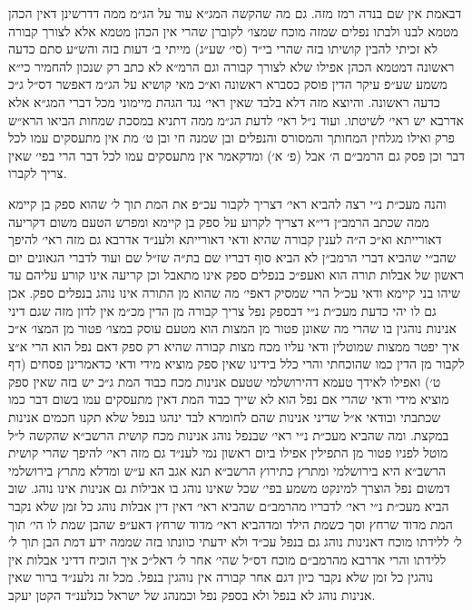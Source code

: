 \documentclass[12pt, openany]{book}
\begin{document}
\begin{multicols}{2}
דבאמת אין שם בנדה רמז מזה. גם מה שהקשה המג״א עוד על הג״מ ממה דדרשינן דאין הכהן מטמא לבנו ולבתו נפלים שמזה מוכח שמצו׳ לקוברן שהרי אין הכהן מטמא אלא לצורך קבורה לא זכיתי להבין קושיתו בזה שהרי בי״ד (סי׳ שע״ג) מייתי ב׳ דעות בזה והש״ע סתם כדעה ראשונה דמטמא הכהן אפילו שלא לצורך קבורה וגם הרמ״א לא כתב רק שנכון להחמיר כי״א משמע שע״פ עיקר הדין פוסק כסברא ראשונה וא״כ מאי קושיא על הג״מ דאפשר דס״ל ג״כ כדעה ראשונה. והיוצא מזה דלא בלבד שאין ראי׳ נגד הגהת מיימוני מכל דברי המג״א אלא אדרבא יש ראי׳ לשיטתו. ועוד נ״ל ראי׳ לדעת הג״מ ממה דתניא במסכת שמחות הביאו הרא״ש פרק ואילו מגלחין המחותך והמסורס והנפלים ובן שמנה חי ובן ט׳ מת אין מתעסקים עמו לכל דבר וכן פסק גם הרמב״ם ה׳ אבל (פ׳ א׳) ומדקאמר אין מתעסקים עמו לכל דבר הרי בפי׳ שאין צריך לקברו.\\\vspace{0pt}

והנה מעכ״ת נ״י רצה להביא ראי׳ דצריך לקבור עכ״פ את המת תוך ל׳ שהוא ספק בן קיימא ממה שכתב הרמב״ן די״א דצריך לקרוע על ספק בן קיימא ומפרש הטעם משום דקריעה דאורייתא וא״כ ה״ה לענין קבורה שהיא ודאי דאורייתא ולענ״ד אדרבא גם מזה ראי׳ להיפך שהב״י שהביא דברי הרמב״ן לא הביא סוף דבריו שם בת״ה שז״ל שם ועוד לדברי הגאונים יום ראשון של אבלות תורה הוא ואעפ״כ בנפלים ספק אינו מתאבל וכן קריעה אינו קורע עליהם עד שיהו בני קיימא ודאי עכ״ל הרי שמסיק דאפי׳ מה שהוא מן התורה אינו נוהג בנפלים ספק. אכן גם לו יהי כדעת מעכ״ת נ״י דבספק נפל צריך קבורה מן הדין מכ״מ אין לדון מזה שגם דיני אנינות נוהגין בו שהרי מה שאונן פטור מן המצות הוא מטעם עוסק במצו׳ פטור מן המצו׳ א״כ איך יפטר ממצות שמוטלין ודאי עליו מכח מצות קבורה שהיא רק ספק דאם נפל הוא הרי א״צ לקבור מן הדין כמו שהוכחתי והרי כלל בידינו שאין ספק מוציא מידי ודאי כדאמרינן פסחים (דף ט׳) ואפילו לאידך טעמא דהירושלמי שטעם אנינות מכח כבוד המת ג״כ יש בזה שאין ספק מוציא מידי ודאי שהרי אם נפל הוא לא שייך כבוד המת דאין מתעסקים עמו בשום דבר כמו שכתבתי ובודאי א״ל שדיני אנינות שהם לחומרא לבד ינהגו בנפל שלא תקנו חכמים אנינות במקצת. ומה שהביא מעכ״ת נ״י ראי׳ שבנפל נוהג אנינות מכח קושית הרשב״א שהקשה ל״ל מוטל לפניו פטור מן התפילין אפילו ביום ראשון נמי לענ״ד גם מזה ראי׳ להיפך שהרי קושית הרשב״א היא בירושלמי ומתרץ כתירוץ הרשב״א תנא אגב הא ע״ש ומדלא מתרץ בירושלמי דמשום נפל הוצרך למינקט משמע בפי׳ שכל שאינו נוהג בו אבילות גם אנינות אינו נוהג. שוב הביא מעכ״ת נ״י ראי׳ לדבריו מהרמב״ם שהביא ראי׳ דאין דין אבלות נוהג כל זמן שלא נקבר המת מדוד שרחץ וסך כשמת הילד ומדהביא ראי׳ מדוד שרחץ דאע״פ שהבן שמת לו הי׳ תוך ל׳ ללידתו מוכח דאנינות נוהג גם בנפל עכ״ד ולא ידעתי כוונתו בזה שממה ידע דמת הבן תוך ל׳ ללידתו והרי אדרבא מהרמב״ם מוכח דס״ל שהי׳ אחר ל׳ דאל״כ איך הוכיח דדיני אבלות אין נוהגין כל זמן שלא נקבר כיון דגם אחר קבורה אין נוהגין בנפל. מכל זה נלענ״ד ברור שאין אנינות נוהג לא בנפל ולא בספק נפל וכמנהג של ישראל כנלענ״ד הקטן יעקב.\\\vspace{0pt}

\end{multicols}\newpage
\end{document}
